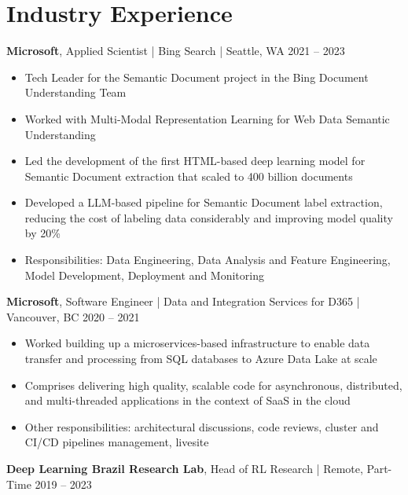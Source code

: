 \documentclass[11pt,letter,sans,colorlinks,linkcolor=true]{moderncv}
\begin{document}
  \vspace{3mm}
\vspace{-3mm}


\section{Industry Experience}
      \textbf{Microsoft},
      Applied Scientist | Bing Search |
      Seattle, WA
      \hfill 2021 -- 2023 \par
          \begin{itemize}
\item[\textbullet]{Tech Leader for the Semantic Document project in the Bing Document Understanding Team}\item[\textbullet]{Worked with Multi-Modal Representation Learning for Web Data Semantic Understanding}\item[\textbullet]{Led the development of the first HTML-based deep learning model for Semantic Document extraction that scaled to 400 billion documents}\item[\textbullet]{Developed a LLM-based pipeline for Semantic Document label extraction, reducing the cost of labeling data considerably and improving model quality by 20\%}\item[\textbullet]{Responsibilities: Data Engineering, Data Analysis and Feature Engineering, Model Development, Deployment and Monitoring}\end{itemize}
      \textbf{Microsoft},
      Software Engineer | Data and Integration Services for D365 |
      Vancouver, BC
      \hfill 2020 -- 2021 \par
          \begin{itemize}
\item[\textbullet]{Worked building up a microservices-based infrastructure to enable data transfer and processing from SQL databases to Azure Data Lake at scale}\item[\textbullet]{Comprises delivering high quality, scalable code for asynchronous, distributed, and multi-threaded applications in the context of SaaS in the cloud}\item[\textbullet]{Other responsibilities: architectural discussions, code reviews, cluster and CI/CD pipelines management, livesite}\end{itemize}
      \textbf{Deep Learning Brazil Research Lab},
      Head of RL Research |
      Remote, Part-Time
      \hfill 2019 -- 2023 \par
\end{document}
